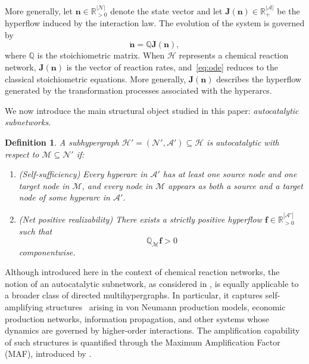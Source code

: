 \documentclass[a4paper,11pt,reqno]{amsart}
\newtheorem{definition}{Definition}[section]
\begin{document}
More generally, let $\mathbf{n}\in\mathbb{R}_{>0}^{|\mathcal{N}|}$ denote the
state vector and let
$\mathbf{J}(\mathbf{n})\in\mathbb{R}_{+}^{|\mathcal{A}|}$ be the hyperflow
induced by the interaction law. The evolution of the system is governed by
\begin{equation}
\dot{\mathbf{n}}=\mathbb{Q}\mathbf{J}(\mathbf{n}),
\label{eq:ode}
\end{equation}
where $\mathbb{Q}$ is the stoichiometric matrix. When $\mathcal{H}$
represents a chemical reaction network, $\mathbf{J}(\mathbf{n})$ is the vector
of reaction rates, and~\eqref{eq:ode} reduces to the classical
stoichiometric equations. More generally, $\mathbf{J}(\mathbf{n})$
describes the hyperflow generated by the transformation processes associated
with the hyperarcs.

We now introduce the main structural object studied in this paper: 
\emph{autocatalytic subnetworks}.

\begin{definition}
\label{def:autoamplificante}
A subhypergraph
$\mathcal{H}'=(\mathcal{N}',\mathcal{A}')\subseteq\mathcal{H}$ is
\emph{autocatalytic} with respect to
$\mathcal{M}\subseteq\mathcal{N}'$ if:
\begin{enumerate}
\item (\emph{Self-sufficiency}) Every hyperarc in $\mathcal{A}'$ has at least
one source node and one target node in $\mathcal{M}$, and every node in
$\mathcal{M}$ appears as both a source and a target node of some hyperarc in
$\mathcal{A}'$.

\item (\emph{Net positive realizability}) There exists a strictly positive
hyperflow
$\mathbf{f}\in\mathbb{R}_{>0}^{|\mathcal{A}'|}$ such that
$$
\mathbb{Q}_{\mathcal{M}}\mathbf{f}>0
$$
componentwise.
\end{enumerate}
\end{definition}

Although introduced here in the context of chemical reaction networks,
the notion of an autocatalytic subnetwork, as considered in \citep{blokhuis2020universal,Gagrani2024}, is equally applicable to a
broader class of directed multihypergraphs. In particular, it captures
self-amplifying structures~\citep{gonzalez2024maf,blanco2026constructing} arising in von Neumann production models,
economic production networks, information propagation, and other systems
whose dynamics are governed by higher-order interactions. The
amplification capability of such structures is quantified through the
Maximum Amplification Factor (MAF), introduced by
\citet{gonzalez2024maf}.
\end{document}
